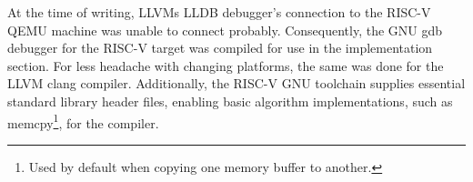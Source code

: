 At the time of writing, LLVMs LLDB debugger's connection to the RISC-V QEMU
machine was unable to connect probably. Consequently, the GNU gdb debugger for
the RISC-V target was compiled for use in the implementation section. For less
headache with changing platforms, the same was done for the LLVM clang compiler.
Additionally, the RISC-V GNU toolchain supplies essential standard library
header files, enabling basic algorithm implementations, such as
memcpy\footnote{Used by default when copying one memory buffer to another.}, for the
compiler.

